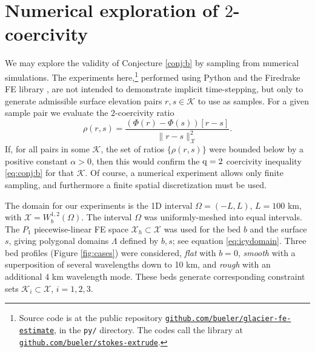\documentclass[hidelinks,onefignum,onetabnum,final]{siamart220329}  %
\newcommand{\cK}{\mathcal{K}}
\newcommand{\cX}{\mathcal{X}}
\newcommand{\qq}{{\text{\textnormal{q}}}}
\begin{document}
\section{Numerical exploration of $2$-coercivity} \label{sec:numerical}

We may explore the validity of Conjecture \ref{conj:b} by sampling from numerical simulations.  The experiments here,\footnote{Source code is at the public repository \href{https://github.com/bueler/glacier-fe-estimate}{\texttt{github.com/bueler/glacier-fe-estimate}}, in the \texttt{py/} directory.  The codes call the library at \href{https://github.com/bueler/stokes-extrude}{\texttt{github.com/bueler/stokes-extrude}}.} performed using Python and the Firedrake FE library \cite{Hametal2023}, are not intended to demonstrate implicit time-stepping, but only to generate admissible surface elevation pairs $r,s\in\cK$ to use as samples.  For a given sample pair we evaluate the $2$-coercivity ratio
\begin{equation}
\rho(r,s) = \frac{\left(\Phi(r) - \Phi(s)\right)[r-s]}{\|r-s\|_{\cX}^2}. \label{eq:Phiratio}
\end{equation}
If, for all pairs in some $\cK$, the set of ratios $\{\rho(r,s)\}$ were bounded below by a positive constant $\alpha>0$, then this would confirm the $\qq=2$ coercivity inequality \eqref{eq:conj:b} for that $\cK$.  Of course, a numerical experiment allows only finite sampling, and furthermore a finite spatial discretization must be used.

The domain for our experiments is the 1D interval $\Omega=(-L,L)$, $L=100$ km, with $\cX = W_b^{1,2}(\Omega)$.  The interval $\Omega$ was uniformly-meshed into equal intervals.  The $P_1$ piecewise-linear FE space $\cX_h\subset \cX$ was used for the bed $b$ and the surface $s$, giving polygonal domains $\Lambda$ defined by $b,s$; see equation \eqref{eq:icydomain}.  Three bed profiles  (Figure \ref{fig:cases}) were considered, \emph{flat} with $b=0$, \emph{smooth} with a superposition of several wavelengths down to 10 km, and \emph{rough} with an additional 4 km wavelength mode.  These beds generate corresponding constraint sets $\cK_i \subset \cX$, $i=1,2,3$.
\end{document}
